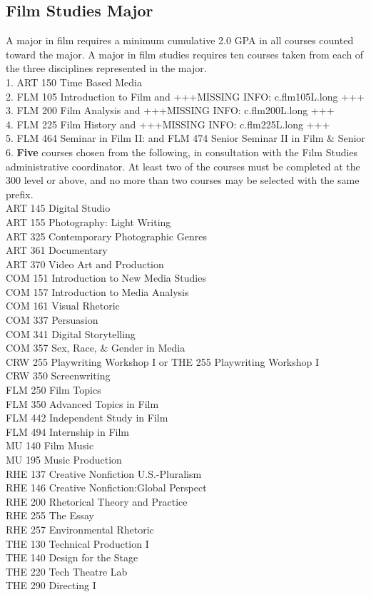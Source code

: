 \documentclass[
  letterpaper,
]{scrbook}
\begin{document}
\subsection{Film Studies Major}\label{film-studies-major}

A major in film requires a minimum cumulative 2.0 GPA in all courses
counted toward the major. A major in film studies requires ten courses
taken from each of the three disciplines represented in the major.\\
1. ART 150 Time Based Media\\
2. FLM 105 Introduction to Film and +++MISSING INFO: c.flm105L.long
+++\\
3. FLM 200 Film Analysis and +++MISSING INFO: c.flm200L.long +++\\
4. FLM 225 Film History and +++MISSING INFO: c.flm225L.long +++\\
5. FLM 464 Seminar in Film II: and FLM 474 Senior Seminar II in Film \&
Senior\\
6. \textbf{Five} courses chosen from the following, in consultation with
the Film Studies administrative coordinator. At least two of the courses
must be completed at the 300 level or above, and no more than two
courses may be selected with the same prefix.\\
ART 145 Digital Studio\\
ART 155 Photography: Light Writing\\
ART 325 Contemporary Photographic Genres\\
ART 361 Documentary\\
ART 370 Video Art and Production\\
COM 151 Introduction to New Media Studies\\
COM 157 Introduction to Media Analysis\\
COM 161 Visual Rhetoric\\
COM 337 Persuasion\\
COM 341 Digital Storytelling\\
COM 357 Sex, Race, \& Gender in Media\\
CRW 255 Playwriting Workshop I or THE 255 Playwriting Workshop I\\
CRW 350 Screenwriting\\
FLM 250 Film Topics\\
FLM 350 Advanced Topics in Film\\
FLM 442 Independent Study in Film\\
FLM 494 Internship in Film\\
MU 140 Film Music\\
MU 195 Music Production\\
RHE 137 Creative Nonfiction U.S.-Pluralism\\
RHE 146 Creative Nonfiction:Global Perspect\\
RHE 200 Rhetorical Theory and Practice\\
RHE 255 The Essay\\
RHE 257 Environmental Rhetoric\\
THE 130 Technical Production I\\
THE 140 Design for the Stage\\
THE 220 Tech Theatre Lab\\
THE 290 Directing I
\end{document}
